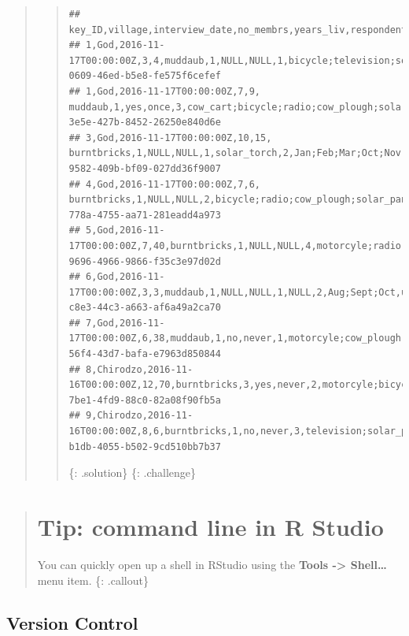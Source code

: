 \documentclass[]{book}
\begin{document}
\begin{quote}
\begin{quote}
\begin{verbatim}
## key_ID,village,interview_date,no_membrs,years_liv,respondent_wall_type,rooms,memb_assoc,affect_conflicts,liv_count,items_owned,no_meals,months_lack_food,instanceID
## 1,God,2016-11-17T00:00:00Z,3,4,muddaub,1,NULL,NULL,1,bicycle;television;solar_panel;table,2,Jan,uuid:ec241f2c-0609-46ed-b5e8-fe575f6cefef
## 1,God,2016-11-17T00:00:00Z,7,9, muddaub,1,yes,once,3,cow_cart;bicycle;radio;cow_plough;solar_panel;solar_torch;table;mobile_phone,2,Jan;Sept;Oct;Nov;Dec,uuid:099de9c9-3e5e-427b-8452-26250e840d6e
## 3,God,2016-11-17T00:00:00Z,10,15, burntbricks,1,NULL,NULL,1,solar_torch,2,Jan;Feb;Mar;Oct;Nov;Dec,uuid:193d7daf-9582-409b-bf09-027dd36f9007
## 4,God,2016-11-17T00:00:00Z,7,6, burntbricks,1,NULL,NULL,2,bicycle;radio;cow_plough;solar_panel;mobile_phone,2,Sept;Oct;Nov;Dec,uuid:148d1105-778a-4755-aa71-281eadd4a973
## 5,God,2016-11-17T00:00:00Z,7,40,burntbricks,1,NULL,NULL,4,motorcyle;radio;cow_plough;mobile_phone,2,Aug;Sept;Oct;Nov,uuid:2c867811-9696-4966-9866-f35c3e97d02d
## 6,God,2016-11-17T00:00:00Z,3,3,muddaub,1,NULL,NULL,1,NULL,2,Aug;Sept;Oct,uuid:daa56c91-c8e3-44c3-a663-af6a49a2ca70
## 7,God,2016-11-17T00:00:00Z,6,38,muddaub,1,no,never,1,motorcyle;cow_plough,3,Nov,uuid:ae20a58d-56f4-43d7-bafa-e7963d850844
## 8,Chirodzo,2016-11-16T00:00:00Z,12,70,burntbricks,3,yes,never,2,motorcyle;bicycle;television;radio;cow_plough;solar_panel;solar_torch;table;fridge,2,Jan,uuid:d6cee930-7be1-4fd9-88c0-82a08f90fb5a
## 9,Chirodzo,2016-11-16T00:00:00Z,8,6,burntbricks,1,no,never,3,television;solar_panel;solar_torch,3,Jan;Dec,uuid:846103d2-b1db-4055-b502-9cd510bb7b37
\end{verbatim}

\{: .solution\} \{: .challenge\}
\end{quote}
\end{quote}

\begin{quote}
\section{Tip: command line in R
Studio}\label{tip-command-line-in-r-studio}

You can quickly open up a shell in RStudio using the \textbf{Tools
-\textgreater{} Shell\ldots{}} menu item. \{: .callout\}
\end{quote}

\subsection{Version Control}\label{version-control}
\end{document}
